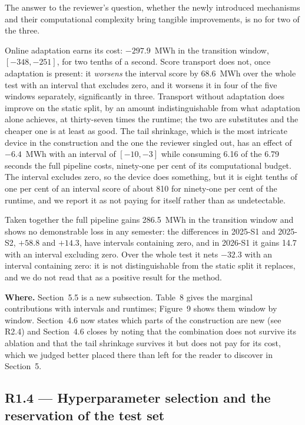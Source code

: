 \documentclass[11pt,a4paper]{article}
\newcommand{\where}[1]{\textbf{Where.} #1}
\begin{document}
The answer to the reviewer's question, whether the newly introduced mechanisms and their computational complexity bring tangible improvements, is no for two of the three.

Online adaptation earns its cost: $-297.9$~MWh in the transition window, $[-348,-251]$, for two tenths of a second. Score transport does not, once adaptation is present: it \emph{worsens} the interval score by 68.6~MWh over the whole test with an interval that excludes zero, and it worsens it in four of the five windows separately, significantly in three. Transport without adaptation does improve on the static split, by an amount indistinguishable from what adaptation alone achieves, at thirty-seven times the runtime; the two are substitutes and the cheaper one is at least as good. The tail shrinkage, which is the most intricate device in the construction and the one the reviewer singled out, has an effect of $-6.4$~MWh with an interval of $[-10,-3]$ while consuming 6.16 of the 6.79 seconds the full pipeline costs, ninety-one per cent of its computational budget. The interval excludes zero, so the device does something, but it is eight tenths of one per cent of an interval score of about 810 for ninety-one per cent of the runtime, and we report it as not paying for itself rather than as undetectable.

Taken together the full pipeline gains 286.5~MWh in the transition window and shows no demonstrable loss in any semester: the differences in 2025-S1 and 2025-S2, $+58.8$ and $+14.3$, have intervals containing zero, and in 2026-S1 it gains 14.7 with an interval excluding zero. Over the whole test it nets $-32.3$ with an interval containing zero: it is not distinguishable from the static split it replaces, and we do not read that as a positive result for the method.

\where{Section~5.5 is a new subsection. Table~8 gives the marginal contributions with intervals and runtimes; Figure~9 shows them window by window. Section~4.6 now states which parts of the construction are new (see R2.4) and Section~4.6 closes by noting that the combination does not survive its ablation and that the tail shrinkage survives it but does not pay for its cost, which we judged better placed there than left for the reader to discover in Section~5.}

\subsection*{R1.4 --- Hyperparameter selection and the reservation of the test set}
\end{document}
